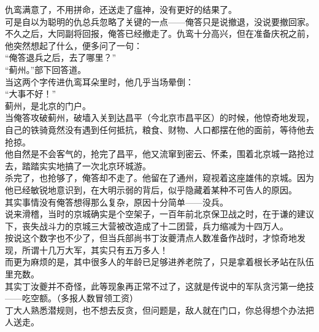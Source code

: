 \begin{multicols}{\theparacolNo}
仇鸾满意了，不用拼命，还送走了瘟神，没有更好的结果了。\\

可是自以为聪明的仇总兵忽略了关键的一点——俺答只是说撤退，没说要撤回家。\\

不久之后，大同副将回报，俺答已经撤走了。仇鸾十分高兴，但在准备庆祝之前，他突然想起了什么，便多问了一句：\\

“俺答退兵之后，去了哪里？”\\

“蓟州。”部下回答道。\\

当这两个字传进仇鸾耳朵里时，他几乎当场晕倒：\\

“大事不好！”\\

蓟州，是北京的门户。\\

当俺答攻破蓟州，破墙入关到达昌平（今北京市昌平区）的时候，他惊奇地发现，自己的铁骑竟然没有遇到任何抵抗，粮食、财物、人口都摆在他的面前，等待他去抢掠。\\

他自然是不会客气的，抢完了昌平，他又流窜到密云、怀柔，围着北京城一路抢过去，踏踏实实地搞了一次北京环城游。\\

杀完了，也抢够了，俺答却不走了。他留在了通州，窥视着这座雄伟的京城。因为他已经敏锐地意识到，在大明示弱的背后，似乎隐藏着某种不可告人的原因。\\

其实事情没有俺答想得那么复杂，原因十分简单——没兵。\\

说来滑稽，当时的京城确实是个空架子，一百年前北京保卫战之时，在于谦的建议下，丧失战斗力的京城三大营被改造成了十二团营，兵力缩减为十四万人。\\

按说这个数字也不少了，但当兵部尚书丁汝夔清点人数准备作战时，才惊奇地发现，所谓十几万大军，其实只有五万多人！\\

而更为麻烦的是，其中很多人的年龄已足够进养老院了，只是拿着根长矛站在队伍里充数。\\

其实丁汝夔并不奇怪，此等现象再正常不过了，这就是传说中的军队贪污第一绝技——吃空额。（多报人数冒领工资）\\

丁大人熟悉潜规则，也不想去反贪，但问题是，敌人就在门口，你总得想个办法把人送走。\\


\end{multicols}
